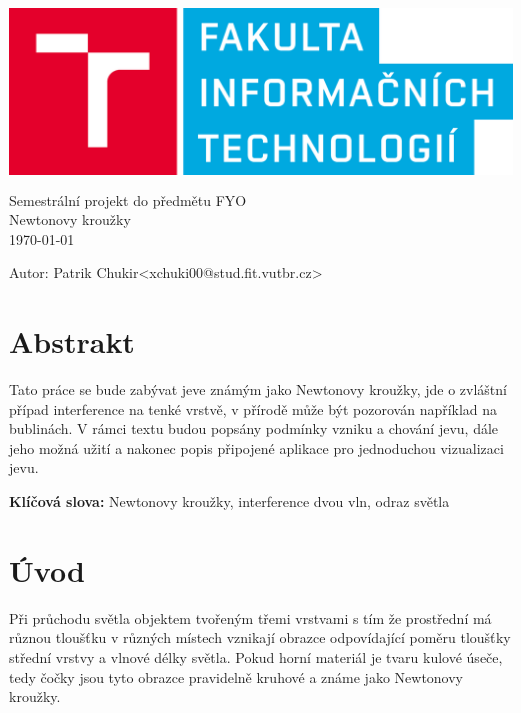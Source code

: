 \documentclass[a4paper, 12pt]{article}
\newcommand\tab[1][1cm]{\hspace*{#1}}
\begin{document}
\begin{center}
	
\includegraphics[height=5cm, width=15cm]{logo}\vspace{3cm}
\LARGE{Semestrální projekt do předmětu FYO}\\\Huge{Newtonovy kroužky}
\vspace{4cm}\\ 
\LARGE{\today \\ }
\vspace{3.5cm}
\end{center}
\Large{Autor: \tab Patrik Chukir\tab <xchuki00@stud.fit.vutbr.cz>}
\normalsize
\pagebreak
\tableofcontents
\pagebreak
\section{Abstrakt}
Tato práce se bude zabývat jeve známým jako Newtonovy kroužky, jde o zvláštní případ interference na tenké vrstvě, v přírodě může být pozorován například na bublinách. V rámci textu budou popsány podmínky vzniku a chování jevu, dále jeho možná užití a nakonec popis připojené aplikace pro jednoduchou vizualizaci jevu.
\vspace{18cm}
\newline

\textbf{Klíčová slova:} Newtonovy kroužky, interference dvou vln, odraz světla 

\section{Úvod}
Při průchodu světla objektem tvořeným třemi vrstvami s tím že prostřední má různou tloušťku v různých místech vznikají obrazce odpovídající poměru tloušťky střední vrstvy a vlnové délky světla. Pokud horní materiál je tvaru kulové úseče, tedy čočky jsou tyto obrazce pravidelně kruhové a známe jako Newtonovy kroužky.
\end{document}
